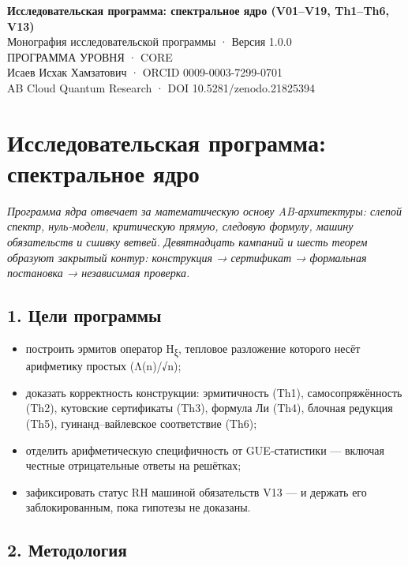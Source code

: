 \documentclass[11pt,a4paper]{article}
\begin{document}
\begin{center}
{\LARGE\bfseries Исследовательская программа: спектральное ядро (V01–V19, Th1–Th6, V13)}\\[8pt]
{\large Монография исследовательской программы · Версия 1.0.0}\\[6pt]
{\color{copper}\small ПРОГРАММА УРОВНЯ · CORE}\\[4pt]
{\small Исаев Исхак Хамзатович · ORCID 0009-0003-7299-0701}\\[2pt]
{\small AB Cloud Quantum Research · DOI 10.5281/zenodo.21825394}
\end{center}

\tableofcontents
\newpage

\section{Исследовательская программа: спектральное ядро}

\noindent\textit{\color{copper}Программа ядра отвечает за математическую основу AB-архитектуры: слепой спектр, нуль-модели, критическую прямую, следовую формулу, машину обязательств и сшивку ветвей. Девятнадцать кампаний и шесть теорем образуют закрытый контур: конструкция → сертификат → формальная постановка → независимая проверка.}

\subsection{1. Цели программы}

\begin{itemize}
  \item построить эрмитов оператор H\textsubscript{ξ}, тепловое разложение которого несёт арифметику простых (Λ(n)/√n);
  \item доказать корректность конструкции: эрмитичность (Th1), самосопряжённость (Th2), кутовские сертификаты (Th3), формула Ли (Th4), блочная редукция (Th5), гуинанд–вайлевское соответствие (Th6);
  \item отделить арифметическую специфичность от GUE-статистики — включая честные отрицательные ответы на решётках;
  \item зафиксировать статус RH машиной обязательств V13 — и держать его заблокированным, пока гипотезы не доказаны.
\end{itemize}

\subsection{2. Методология}
\end{document}
